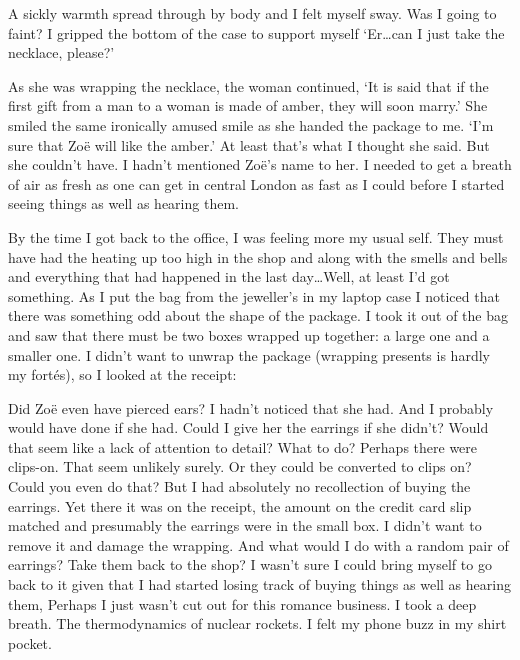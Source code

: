 A sickly warmth spread through by body and I felt myself sway. Was I
going to faint? I gripped the bottom of the case to support myself
`Er\dots can I just take the necklace, please?'

As she was wrapping the necklace, the woman continued, `It is said
that if the first gift from a man to a woman is made of amber, they
will soon marry.' She smiled the same ironically amused smile as she
handed the package to me. `I'm sure that Zoë will like the
amber.' At least that's what I thought she said. But she couldn't
have. I hadn't mentioned Zoë's name to her. I needed to get a
breath of air as fresh as one can get in central London as fast as I
could before I started seeing things as well as hearing them.

By the time I got back to the office, I was feeling more my usual
self. They must have had the heating up too high in the shop and
along with the smells and bells and everything that had happened in
the last day\dots Well, at least I'd got something. As I put the bag
from the jeweller's in my laptop case I noticed that there was
something odd about the shape of the package. I took it out of the
bag and saw that there must be two boxes wrapped up together: a
large one and a smaller one. I didn't want to unwrap the package
(wrapping presents is hardly my fortés), so I looked at the
receipt:

{}

Did Zoë even have pierced ears? I hadn't noticed that she had. And I probably would have done if she had.
Could I give her the earrings if she didn't? Would that seem like a lack of attention to detail?  What to do? Perhaps there were clips-on. That seem unlikely surely. Or they could be converted to clips on? Could you even do that? But I had absolutely no recollection of
buying the earrings. Yet there it was on the receipt, the amount on
the credit card slip matched and presumably the earrings were in the
small box. I didn't want to remove it and damage the wrapping. And what would I do with a random pair of earrings? Take them back to the shop? I wasn't sure I could bring myself to go back to it given that I had started losing track of buying things as well as
hearing them, Perhaps I just wasn't cut out for this romance business.
I took a deep breath. The thermodynamics of nuclear rockets. I felt
my phone buzz in my shirt pocket.

\vskip 1cm

